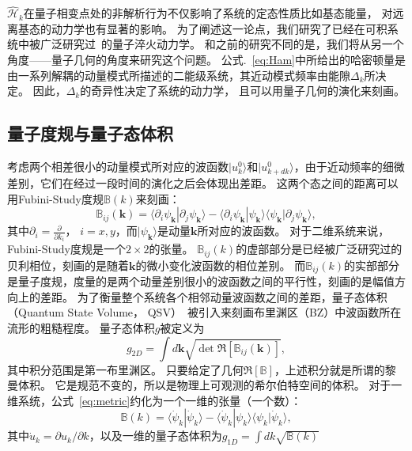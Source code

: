 			$\hat{\mathcal{H}}_k$在量子相变点处的非解析行为不仅影响了系统的定态性质比如基态能量， 对远离基态的动力学也有显著的影响。
			为了阐述这一论点，我们研究了已经在可积系统中被广泛研究过~\cite{Barthel2008,Calabrese2011,Mitra2018}的量子淬火动力学。
			和之前的研究不同的是，我们将从另一个角度——量子几何的角度来研究这个问题。
			公式.~\eqref{eq:Ham}中所给出的哈密顿量是由一系列解耦的动量模式所描述的二能级系统，其近动模式频率由能隙$\Delta_k$所决定。
			因此，$\Delta_k$的奇异性决定了系统的动力学， 且可以用量子几何的演化来刻画。
		
		\subsection{量子度规与量子态体积}
		
			考虑两个相差很小的动量模式所对应的波函数$|u^0_k\rangle$和$|u^0_{k+dk}\rangle$，由于近动频率的细微差别，它们在经过一段时间的演化之后会体现出差距。
			这两个态之间的距离可以用Fubini-Study度规$\mathbb{B}(k)$来刻画：
			\begin{equation}
				\mathbb{B}_{ij}(\mathbf{k})=\langle\partial_i \psi_\mathbf{k} |\partial_j \psi_\mathbf{k}\rangle-\langle\partial_i \psi_\mathbf{k} |\psi_\mathbf{k}\rangle \langle \psi_\mathbf{k}|\partial_j \psi_\mathbf{k}\rangle, \label{eq:metric}
			\end{equation}
			其中$\partial_i=\frac{\partial}{\partial k_i}$， $i=x,y$，而$|\psi_\mathbf{k}\rangle$是动量$\mathbf{k}$所对应的波函数。
			对于二维系统来说，Fubini-Study度规是一个$2\times2$的张量。
			$\mathbb{B}_{ij}(k)$的虚部部分是已经被广泛研究过的贝利相位，刻画的是随着$\mathbf{k}$的微小变化波函数的相位差别。
			而$\mathbb{B}_{ij}(k)$的实部部分是量子度规，度量的是两个动量差别很小的波函数之间的平行性，刻画的是幅值方向上的差距。
			为了衡量整个系统各个相邻动量波函数之间的差距，量子态体积（Quantum State Volume， QSV）~\cite{Ozawa20210}被引入来刻画布里渊区（BZ）中波函数所在流形的粗糙程度。
			量子态体积$g$被定义为
			\begin{equation} \label{eq:g_2D}
				g_{2D}=\int d\mathbf{k} \sqrt{\det\Re[\mathbb{B}_{ij}(\mathbf{k})]},
			\end{equation}
			其中积分范围是第一布里渊区。
			只要给定了几何$\Re[\mathbb{B}]$，上述积分就是所谓的黎曼体积。
			它是规范不变的，所以是物理上可观测的希尔伯特空间的体积。
			对于一维系统，公式~\eqref{eq:metric}约化为一个一维的张量（一个数）：
			\begin{equation}\label{eq:B_1D}
				\mathbb{B}(k)= \langle \dot{\psi}_k|\dot{\psi}_k\rangle-\langle \dot{\psi}_k|\psi_k\rangle \langle \psi_k|\dot{\psi}_k \rangle,
			\end{equation}
			其中$\dot{u}_k=\partial u_k/\partial k$，以及一维的量子态体积为$g_{1D}=\int dk \sqrt{\mathbb{B}(k)}$

